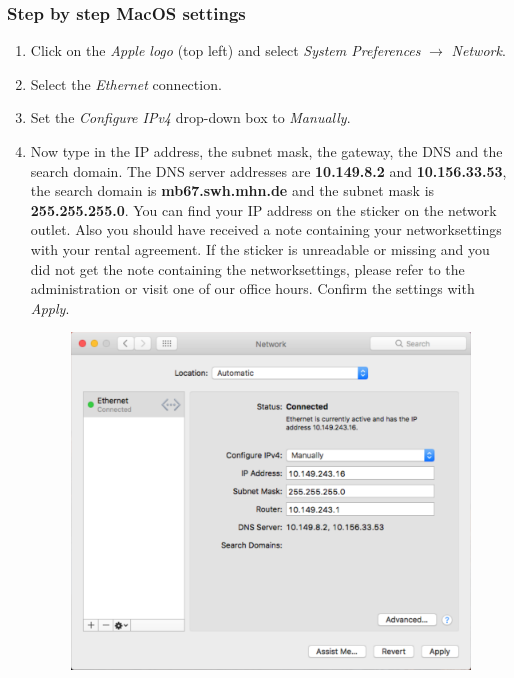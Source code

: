 \documentclass[a4paper,12pt]{scrartcl}
\begin{document}
\subsubsection*{Step by step MacOS settings}
\begin{enumerate}
	\item Click on the \emph{Apple logo} (top left) and select \emph{System Preferences} $\rightarrow$ \emph{Network}.
	\item Select the \emph{Ethernet} connection.
	\item Set the \emph{Configure IPv4} drop-down box to \emph{Manually}.
	\item Now type in the IP address, the subnet mask, the gateway, the DNS and the search domain. The DNS server addresses are \textbf{10.149.8.2} and \textbf{10.156.33.53}, the search domain is \textbf{mb67.swh.mhn.de} and the subnet mask is \textbf{255.255.255.0}. You can find your IP address on the sticker on the network outlet. Also you should have received a note containing your networksettings with your rental agreement. If the sticker is unreadable or missing and you did not get the note containing the networksettings, please refer to the administration or visit one of our office hours. Confirm the settings with \emph{Apply}.
      \begin{figure}[h!]
      \centering
        \begin{minipage}[c]{0.60\linewidth}
          \centering
          \includegraphics[width=0.9\linewidth,keepaspectratio]{Bilder/IP_Mac_EN_mb}
        \end{minipage}
      \vspace{-20pt}
      \end{figure}
\end{enumerate}
\end{document}
